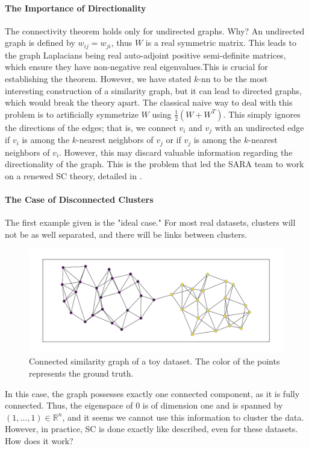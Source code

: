 \documentclass[a4paper,12pt]{article}
\theoremstyle{definition}
\theoremstyle{plain}
\def\R{\mathbb{R}}%
\begin{document}
\paragraph{The Importance of Directionality}
The connectivity theorem holds only for undirected graphs. Why? An undirected graph is defined by $w_{ij}=w_{ji}$, thus $W$ is a real symmetric matrix. This leads to the graph Laplacians being real auto-adjoint positive semi-definite matrices, which ensure they have non-negative real eigenvalues.This is crucial for establishing the theorem. However, we have stated $k$-nn to be the most interesting construction of a similarity graph, but it can lead to directed graphs, which would break the theory apart. The classical naive way to deal with this problem is to artificially symmetrize $W$ using $\frac{1}{2}(W + W^{T})$. This simply ignores the directions of the edges; that is, we connect $v_i$ and $v_j$ with an undirected edge if $v_i$ is among the $k$-nearest neighbors of $v_j$ or if $v_j$ is among the $k$-nearest neighbors of $v_i$. However, this may discard valuable information regarding the directionality of the graph. This is the problem that led the SARA team to work on a renewed SC theory, detailed in \cite{GSC}.

\paragraph{The Case of Disconnected Clusters}
The first example given is the "ideal case." For most real datasets, clusters will not be as well separated, and there will be links between clusters.

\begin{figure}[H]
	\centering
	\includegraphics[width=0.6\linewidth]{figures/connected_example}
	\caption{Connected similarity graph of a toy dataset. The color of the points represents the ground truth. }
	\label{fig:connected_example}
\end{figure}

In this case, the graph possesses exactly one connected component, as it is fully connected. Thus, the eigenspace of $0$ is of dimension one and is spanned by $(1,\ldots,1) \in \R^n$, and it seems we cannot use this information to cluster the data. However, in practice, SC is done exactly like described, even for these datasets. How does it work?
\end{document}
